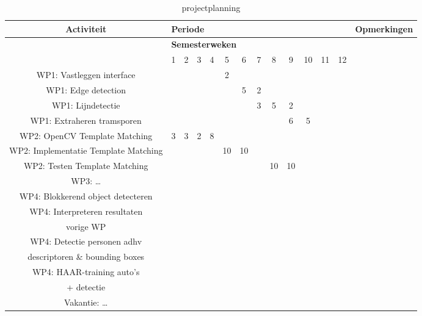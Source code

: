 \documentclass[a4paper,oneside,11pt,final]{memoir}
\begin{document}
\begin{table}[h]
	\centering
		\begin{tabular}{|*{14}{c|}}
		\hline
		\textbf{Activiteit} & \multicolumn{12}{l|}{\textbf{Periode}} & \textbf{Opmerkingen} \\
		\hline
							 & \multicolumn{12}{l|}{\textbf{Semesterweken}} &   \\
		\hline 
		  & 1	& 2	& 3	& 4	& 5	& 6	& 7	& 8	& 9	& 10 & 11	& 12 & \\
		\hline 
		WP1: Vastleggen interface & & & & & 2 & & & & & & & & \\
		\hline 
		WP1: Edge detection & & & & & & 5 & 2 & & & & & & \\
		\hline 
		WP1: Lijndetectie & & & & & & & 3 & 5 & 2 & & & & \\
		\hline 
		WP1: Extraheren tramsporen & & & & & & & & & 6 & 5 & & & \\
		\hline 
		\hline 
		WP2: OpenCV Template Matching &  3 & 3 & 2 & 8 & & & & & & & & & \\
		\hline 
		WP2: Implementatie Template Matching & & & & &10&10& & & & & & & \\
		\hline 
		WP2: Testen Template Matching & & & & & & & &10&10&& & &\\
		\hline 
		WP3: \ldots & & & & & & & & & & & & & \\
		\hline 
		WP4: Blokkerend object detecteren& & & & & & & & & & & & & \\
		\hline
		WP4: Interpreteren resultaten & & & & & & & & & & & & & \\
		vorige WP& & & & & & & & & & & & & \\
		\hline
		WP4: Detectie personen adhv & & & & & & & & & & & & & \\
		 descriptoren \& bounding boxes& & & & & & & & & & & & & \\
		\hline
		WP4: HAAR-training auto's & & & & & & & & & & & & & \\
		+ detectie & & & & & & & & & & & & & \\
		\hline 
		Vakantie: \ldots & & & & & & & & & & & & & \\
		\hline
		\end{tabular}
	\caption{projectplanning}
	\label{tab:projectplanning}
\end{table}
																							

\end{document}
